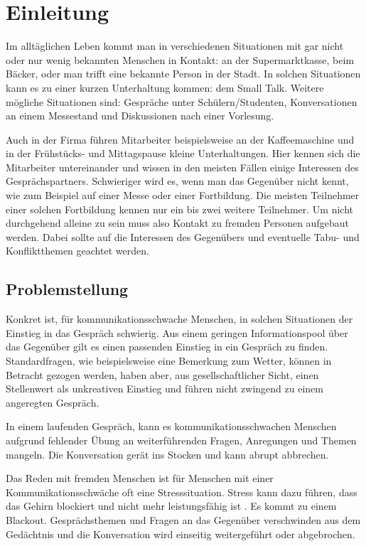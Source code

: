 \chapter{Einleitung}
\label{ch:einleitung}

Im alltäglichen Leben kommt man in verschiedenen Situationen mit gar nicht oder nur wenig bekannten Menschen in Kontakt: an der Supermarktkasse, beim Bäcker, oder man trifft eine bekannte Person in der Stadt. In solchen Situationen kann es zu einer kurzen Unterhaltung kommen: dem Small Talk. Weitere mögliche Situationen sind: Gespräche unter Schülern/Studenten, Konversationen an einem Messestand und Diskussionen nach einer Vorlesung.

Auch in der Firma führen Mitarbeiter beispielsweise an der Kaffeemaschine und in der Frühstücks- und Mittagspause kleine Unterhaltungen. Hier kennen sich die Mitarbeiter untereinander und wissen in den meisten Fällen einige Interessen des Gesprächspartners. Schwieriger wird es, wenn man das Gegenüber nicht kennt, wie zum Beispiel auf einer Messe oder einer Fortbildung. \newline
Die meisten Teilnehmer einer solchen Fortbildung kennen nur ein bis zwei weitere Teilnehmer. Um nicht durchgehend alleine zu sein muss also Kontakt zu fremden Personen aufgebaut werden. Dabei sollte auf die Interessen des Gegenübers und eventuelle Tabu- und Konfliktthemen geachtet werden.


\section{Problemstellung}
\label{sec:problemstellung}

Konkret ist, für kommunikationsschwache Menschen, in solchen Situationen der Einstieg in das Gespräch schwierig. Aus einem geringen Informationspool über das Gegenüber gilt es einen passenden Einstieg in ein Gespräch zu finden. Standardfragen, wie beispielsweise eine Bemerkung zum Wetter, können in Betracht gezogen werden, haben aber, aus gesellschaftlicher Sicht, einen Stellenwert als unkreativen Einstieg und führen nicht zwingend zu einem angeregten Gespräch.

In einem laufenden Gespräch, kann es kommunikationsschwachen Menschen aufgrund fehlender Übung an weiterführenden Fragen, Anregungen und Themen mangeln. Die Konversation gerät ins Stocken und kann abrupt abbrechen.

Das Reden mit fremden Menschen ist für Menschen mit einer Kommunikationsschwäche oft eine Stresssituation. Stress kann dazu führen, dass das Gehirn blockiert und nicht mehr leistungsfähig ist \cite[S.~79~f.]{Roese:Lernen-OHNE-Stress}. Es kommt zu einem Blackout. Gesprächsthemen und Fragen an das Gegenüber verschwinden aus dem Gedächtnis und die Konversation wird einseitig weitergeführt oder abgebrochen.

